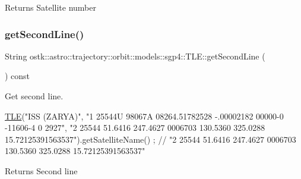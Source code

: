 \begin{DoxyReturn}{Returns}
Satellite number 
\end{DoxyReturn}
\mbox{\label{classostk_1_1astro_1_1trajectory_1_1orbit_1_1models_1_1sgp4_1_1_t_l_e_a6f1f60f662a1891ce93576344989502a}} 
\subsubsection{\texorpdfstring{get\+Second\+Line()}{getSecondLine()}}
{\footnotesize\ttfamily String ostk\+::astro\+::trajectory\+::orbit\+::models\+::sgp4\+::\+T\+L\+E\+::get\+Second\+Line (\begin{DoxyParamCaption}{ }\end{DoxyParamCaption}) const}



Get second line. 


\begin{DoxyCode}
\hyperlink{classostk_1_1astro_1_1trajectory_1_1orbit_1_1models_1_1sgp4_1_1_t_l_e_a57323db2c24577c2e8ddce79fa776d1e}{TLE}(\textcolor{stringliteral}{"ISS (ZARYA)"},
    \textcolor{stringliteral}{"1 25544U 98067A   08264.51782528 -.00002182  00000-0 -11606-4 0  2927"},
    \textcolor{stringliteral}{"2 25544  51.6416 247.4627 0006703 130.5360 325.0288 15.72125391563537"}).getSatelliteName() ; \textcolor{comment}{// "2
       25544  51.6416 247.4627 0006703 130.5360 325.0288 15.72125391563537"}
\end{DoxyCode}


\begin{DoxyReturn}{Returns}
Second line 
\end{DoxyReturn}
\mbox{\label{classostk_1_1astro_1_1trajectory_1_1orbit_1_1models_1_1sgp4_1_1_t_l_e_a66f25eab1f7e8f7e511ad0a77da90de7}} 
